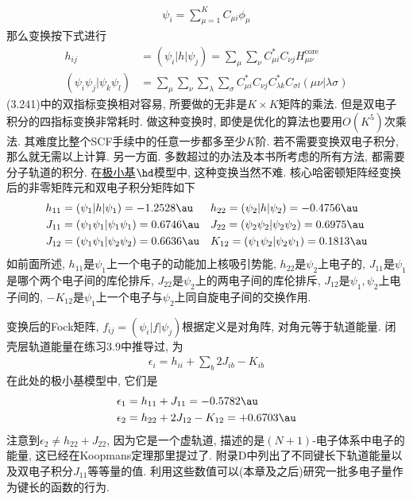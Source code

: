 \begin{align}
\psi_i = \sum_{\mu=1}^{K}C_{\mu i}\phi_\mu
\end{align}
那么变换按下式进行
\begin{align}
h_{ij} & = (\psi_i|h|\psi_j) = \sum_{\mu}\sum_{\nu}C_{\mu i}^*C_{\nu j}H_{\mu\nu}^\mathrm{core}\\
(\psi_i\psi_j|\psi_k\psi_l) & = \sum_\mu\sum_\nu\sum_\lambda\sum_\sigma C_{\mu i}^*C_{\nu j}C_{\lambda k}^*C_{\sigma l}(\mu\nu|\lambda\sigma)
\end{align}
(3.241)中的双指标变换相对容易, 所要做的无非是$K\times K$矩阵的乘法. 但是双电子积分的四指标变换非常耗时. 做这种变换时, 即使是优化的算法也要用$O(K^5)$次乘法. 其难度比整个SCF手续中的任意一步都多至少$K$阶. 若不需要变换双电子积分, 那么就无需以上计算. 另一方面. 多数超过\hft 的办法及本书所考虑的所有方法, 都需要分子轨道的积分. 在\underline{极小基$\hd$}模型中, 这种变换当然不难. 核心哈密顿矩阵经变换后的非零矩阵元和双电子积分矩阵如下
\begin{align*}
h_{11}& =(\psi_1|h|\psi_1)=-1.2528\au &&h_{22}=(\psi_2|h|\psi_2)=-0.4756\au\\
J_{11}& =(\psi_1\psi_1|\psi_1\psi_1)=0.6746\au &&J_{22}=(\psi_2\psi_2|\psi_2\psi_2)=0.6975\au\\
J_{12}& =(\psi_1\psi_1|\psi_2\psi_2)=0.6636\au &&K_{12}=(\psi_1\psi_2|\psi_2\psi_1)=0.1813\au
\end{align*}
如前面所述, $h_{11}$是$\psi_1$上一个电子的动能加上核吸引势能, $h_{22}$是$\psi_2$上电子的, $J_{11}$是$\psi_1$是哪个两个电子间的库伦排斥, $J_{22}$是$\psi_2$上的两电子间的库伦排斥, $J_{12}$是$\psi_1,\psi_2$上电子间的, $-K_{12}$是$\psi_1$上一个电子与$\psi_2$上同自旋电子间的交换作用.

变换后的Fock矩阵, $f_{ij}=(\psi_i|f|\psi_j)$根据定义是对角阵, 对角元等于轨道能量. 闭壳层轨道能量在练习3.9中推导过, 为
\begin{align}
\epsilon_i = h_{ii} + \sum_b2J_{ib} -K_{ib}
\end{align}
在此处的极小基模型中, 它们是
\begin{align}
\epsilon_1 & = h_{11} + J_{11} = -0.5782\au\\
\epsilon_2 & = h_{22} + 2J_{12} - K_{12} = +0.6703\au
\end{align}
注意到$\epsilon_2\neq h_{22}+J_{22}$, 因为它是一个虚轨道, 描述的是$(N+1)$-电子体系中电子的能量, 这已经在Koopmans定理那里提过了. 附录D中列出了不同键长下轨道能量以及双电子积分$J_{11}$等等量的值. 利用这些数值可以(本章及之后)研究一批多电子量作为键长的函数的行为.

